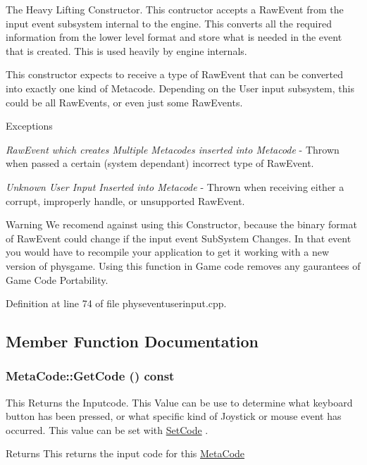 The Heavy Lifting Constructor. This contructor accepts a RawEvent from the input event subsystem internal to the engine. This converts all the required information from the lower level format and store what is needed in the event that is created. This is used heavily by engine internals. \par
 This constructor expects to receive a type of RawEvent that can be converted into exactly one kind of Metacode. Depending on the User input subsystem, this could be all RawEvents, or even just some RawEvents. 
\begin{DoxyExceptions}{Exceptions}
\item[{\em RawEvent which creates Multiple Metacodes inserted into Metacode}]-\/ Thrown when passed a certain (system dependant) incorrect type of RawEvent. \item[{\em Unknown User Input Inserted into Metacode}]-\/ Thrown when receiving either a corrupt, improperly handle, or unsupported RawEvent. \end{DoxyExceptions}
\begin{DoxyWarning}{Warning}
We recomend against using this Constructor, because the binary format of RawEvent could change if the input event SubSystem Changes. In that event you would have to recompile your application to get it working with a new version of physgame. Using this function in Game code removes any gaurantees of Game Code Portability. 
\end{DoxyWarning}


Definition at line 74 of file physeventuserinput.cpp.

\subsection{Member Function Documentation}
\hypertarget{classMetaCode_a94532fc103d95f3de53eeccbadd6f17b}{
\subsubsection[{GetCode}]{ MetaCode::GetCode () const}}
\label{d7/d72/classMetaCode_a94532fc103d95f3de53eeccbadd6f17b}


This Returns the Inputcode. This Value can be use to determine what keyboard button has been pressed, or what specific kind of Joystick or mouse event has occurred. This value can be set with \hyperlink{classMetaCode_a9be5fcad22449c12b649801ab97bbf20}{SetCode} . \begin{DoxyReturn}{Returns}
This returns the input code for this \hyperlink{classMetaCode}{MetaCode} 
\end{DoxyReturn}


